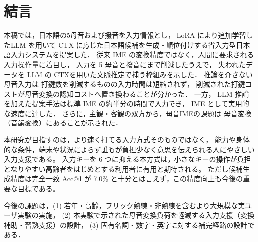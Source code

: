 \section{結言}

本稿では，日本語の5母音および撥音を入力情報とし，
LoRA により追加学習したLLM を用いて
CTX に応じた日本語候補を生成・順位付けする省入力型日本語入力システムを提案した．
従来 IME の変換精度ではなく，人間に要求される入力操作量に着目し，
入力を 5 母音と撥音にまで削減したうえで，
失われたデータを LLM の CTXを用いた文脈推定で補う枠組みを示した．
推論を介さない母音入力は
打鍵数を削減するものの入力時間は短縮されず，
削減された打鍵コストが母音変換の認知コストへ置き換わることが分かった．
一方，
LLM 推論を加えた提案手法は標準 IME の約半分の時間で入力でき，
IME として実用的な速度に達した．
さらに，主観・客観の双方から，母音IMEの課題は
母音変換（音韻変換）にあることが示された．

本研究が目指すのは，より速く打てる入力方式そのものではなく，
能力や身体的な条件，端末や状況によらず誰もが負担少なく意思を伝えられる人にやさしい入力支援である。
入力キーを 6 つに抑える本方式は，小さなキーの操作が負担となりやすい高齢者をはじめとする利用者に有用と期待される。
ただし候補生成精度は完全一致 Acc@1 が 7.0\% と十分とは言えず，この精度向上も今後の重要な目標である。

今後の課題は，(1) 若年・高齢，フリック熟練・非熟練を含むより大規模な実ユーザ実験の実施，
(2) 本実験で示された母音変換負荷を軽減する入力支援（変換補助・習熟支援）の設計，
(3) 固有名詞・数字・英字に対する補完経路の設計である．
